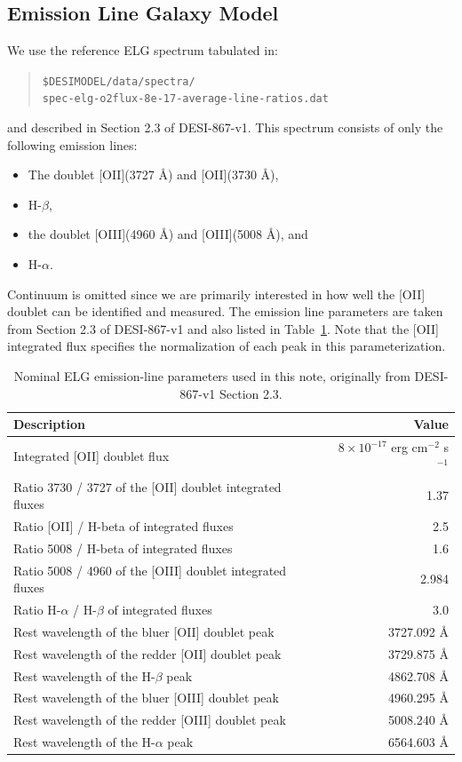 \documentclass[12pt]{article}
\providecommand{\tab}[1]{Table~\ref{tab:#1}}
\begin{document}
\subsection{Emission Line Galaxy Model}

We use the reference ELG spectrum tabulated in:
\begin{quote}
{\tt \$DESIMODEL/data/spectra/\\
spec-elg-o2flux-8e-17-average-line-ratios.dat}
\end{quote}
and described in Section 2.3 of DESI-867-v1\cite{desi-867}. This spectrum consists of only the following emission lines:
\begin{itemize}
    \item The doublet [OII](3727 \AA) and [OII](3730 \AA),
    \item H-$\beta$,
    \item the doublet [OIII](4960 \AA) and [OIII](5008 \AA), and
    \item H-$\alpha$.
\end{itemize}
Continuum is omitted since we are primarily interested in how well
the [OII] doublet can be identified and measured.  The emission line parameters are taken from Section 2.3 of DESI-867-v1 and also listed
in \tab{elg-params}. Note that the [OII] integrated flux specifies the normalization of each peak in this parameterization.

\begin{table}[htb]
\begin{center}
\begin{tabular}{lr}
    Description & Value \\
    \hline
    Integrated [OII] doublet flux & $8\times 10^{-17}$ erg cm$^{-2}$ s$^{-1}$ \\
    Ratio 3730 / 3727 of the [OII] doublet integrated fluxes & 1.37 \\
    Ratio [OII] / H-beta of integrated fluxes & 2.5 \\
    Ratio 5008 / H-beta of integrated fluxes & 1.6 \\
    Ratio 5008 / 4960 of the [OIII] doublet integrated fluxes & 2.984 \\
    Ratio H-$\alpha$ / H-$\beta$ of integrated fluxes & 3.0 \\
    \hline
    Rest wavelength of the bluer [OII] doublet peak & 3727.092 \AA \\
    Rest wavelength of the redder [OII] doublet peak & 3729.875 \AA \\
    Rest wavelength of the H-$\beta$ peak & 4862.708 \AA \\
    Rest wavelength of the bluer [OIII] doublet peak & 4960.295 \AA \\
    Rest wavelength of the redder [OIII] doublet peak & 5008.240 \AA \\
    Rest wavelength of the H-$\alpha$ peak & 6564.603 \AA \\
    \hline
\end{tabular}
\caption{Nominal ELG emission-line parameters used in this note, originally from DESI-867-v1 Section 2.3.}
\label{tab:elg-params}
\end{center}
\end{table}
\end{document}
